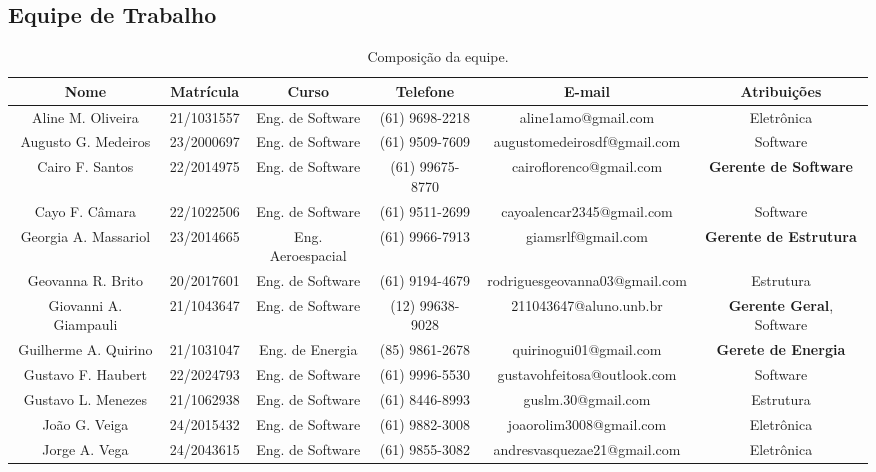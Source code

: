 \begin{landscape}

\chapter{Equipe de Trabalho}

\begin{table}[htpb]
\begin{center}
\caption{Composição da equipe.}
\begin{tabular}{|c|c|c|c|c|c|}
\hline
\textbf{Nome} & \textbf{Matrícula} & \textbf{Curso} & \textbf{Telefone} & \textbf{E-mail} & \textbf{Atribuições}\\ \hline
Aline M. Oliveira        & 21/1031557        & Eng. de Software      & (61) 9698-2218   & aline1amo@gmail.com   & Eletrônica\\ \hline
Augusto G. Medeiros     & 23/2000697        & Eng. de Software     & (61) 9509-7609   & augustomedeirosdf@gmail.com & Software \\ \hline
Cairo F. Santos       & 22/2014975        & Eng. de Software      & (61) 99675-8770   & cairoflorenco@gmail.com        & \textbf{Gerente de Software}\\ \hline
Cayo F. Câmara & 22/1022506 & Eng. de Software & (61) 9511-2699 & cayoalencar2345@gmail.com & Software \\ \hline
Georgia A. Massariol & 23/2014665 & Eng. Aeroespacial & (61) 9966-7913 & giamsrlf@gmail.com & \textbf{Gerente de Estrutura}\\ \hline
Geovanna R. Brito & 20/2017601 & Eng. de Software & (61) 9194-4679 & rodriguesgeovanna03@gmail.com & Estrutura \\ \hline
Giovanni A. Giampauli & 21/1043647 & Eng. de Software & (12) 99638-9028  & 211043647@aluno.unb.br & \textbf{Gerente Geral}, Software \\ \hline
Guilherme A. Quirino & 21/1031047 & Eng. de Energia & (85) 9861-2678 & quirinogui01@gmail.com & \textbf{Gerete de Energia} \\ \hline
Gustavo F. Haubert & 22/2024793 & Eng. de Software & (61) 9996-5530 & gustavohfeitosa@outlook.com & Software \\ \hline
Gustavo L. Menezes & 21/1062938 & Eng. de Software & (61) 8446-8993 & guslm.30@gmail.com & Estrutura \\ \hline
João G. Veiga & 24/2015432 & Eng. de Software & (61) 9882-3008 & joaorolim3008@gmail.com & Eletrônica \\ \hline
Jorge A. Vega & 24/2043615 & Eng. de Software & (61) 9855-3082 & andresvasquezae21@gmail.com & Eletrônica \\ \hline

\end{tabular}
\end{center}
\end{table}
\end{landscape}
